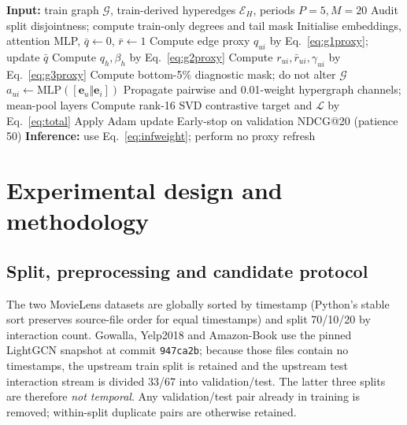 \documentclass[a4paper,fleqn,longmktitle]{cas-dc}
\begin{document}
\begin{algorithm}[t]
\caption{Retained CoopGCN proxy training path}
\label{alg:coopgcn}
\small
\begin{algorithmic}[1]
\State \textbf{Input:} train graph $\mathcal G$, train-derived hyperedges
$\mathcal E_H$, periods $P=5,M=20$
\State Audit split disjointness; compute train-only degrees and tail mask
\State Initialise embeddings, attention MLP, $\bar q\gets0$, $\bar r\gets1$
    \State Compute edge proxy $q_{ui}$ by Eq.~\eqref{eq:g1proxy}; update
    $\bar q$ 
    \State Compute $q_h,\beta_h$ by Eq.~\eqref{eq:g2proxy}
  \EndIf
    \State Compute $r_{ui},\bar r_{ui},\gamma_{ui}$ by
    Eq.~\eqref{eq:g3proxy} 
    \State Compute bottom-5\% diagnostic mask; do not alter $\mathcal G$
  \EndIf
    \State $a_{ui}\gets\mathrm{MLP}([\mathbf e_u\Vert\mathbf e_i])$
    \State Propagate pairwise and 0.01-weight hypergraph channels; mean-pool
    layers
    \State Compute rank-16 SVD contrastive target and
    $\mathcal L$ by Eq.~\eqref{eq:total}
    \State Apply Adam update
  \EndFor
  \State Early-stop on validation NDCG@20 (patience 50)
\EndFor
\State \textbf{Inference:} use Eq.~\eqref{eq:infweight}; perform no proxy
refresh
\end{algorithmic}
\end{algorithm}

\section{Experimental design and methodology}
\label{sec:design}

\subsection{Split, preprocessing and candidate protocol}
\label{sec:leakage}

The two MovieLens datasets are globally sorted by timestamp (Python's stable
sort preserves source-file order for equal timestamps) and split 70/10/20 by
interaction count. Gowalla, Yelp2018 and Amazon-Book use the pinned LightGCN
snapshot at commit \texttt{947ca2b}; because those files contain no timestamps,
the upstream train split is retained and the upstream test interaction stream
is divided 33/67 into validation/test. The latter three splits are therefore
\emph{not temporal}. Any validation/test pair already in training is removed;
within-split duplicate pairs are otherwise retained.
\end{document}

